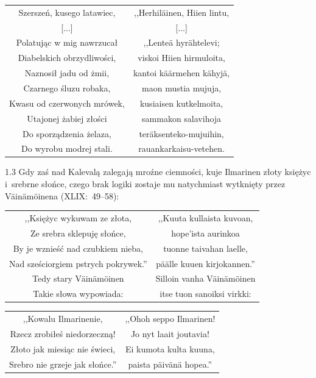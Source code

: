 \documentclass[11pt,a4paper,twoside]{report}
\begin{document}
{\centering
\small
\begin{longtable}{c c}
Szerszeń, kusego latawiec, & ,,Herhiläinen, Hiien lintu, \\
{[...]} & {[...]}\\
Polatując w mig nawrzucał & ,,Lenteä hyrähtelevi; \\
Diabelskich obrzydliwości, & viskoi Hiien hirmuloita, \\
Naznosił jadu od żmii, & kantoi käärmehen kähyjä, \\
Czarnego śluzu robaka, & maon mustia mujuja, \\
Kwasu od czerwonych mrówek, & kusiaisen kutkelmoita, \\
Utajonej żabiej złości & sammakon salavihoja \\
Do sporządzenia żelaza, & teräksenteko-mujuihin, \\
Do wyrobu modrej stali. & rauankarkaisu-vetehen. \\
\end{longtable}
}
\begin{spacing}{1.3}
Gdy zaś nad Kalevalą zalegają mroźne ciemności, kuje Ilmarinen złoty księżyc i~srebrne słońce, czego brak logiki zostaje mu natychmiast wytknięty przez Väinämöinena (XLIX:~49--58):
\end{spacing}
{\centering
\small
\begin{longtable}{c c}
,,Księżyc wykuwam ze złota, & ,,Kuuta kullaista kuvoan, \\
Ze srebra sklepuję słońce, & hope'ista aurinkoa \\
By je wznieść nad czubkiem nieba, & tuonne taivahan laelle, \\
Nad sześciorgiem pstrych pokrywek.'' & päälle kuuen kirjokannen.'' \\
Tedy stary Väinämöinen & Silloin vanha Väinämöinen \\
Takie słowa wypowiada: & itse tuon sanoiksi virkki: \\ %
\end{longtable}
}
{\centering
\small
\begin{longtable}{c c}
,,Kowalu Ilmarinenie, & ,,Ohoh seppo Ilmarinen! \\
Rzecz zrobiłeś niedorzeczną! & Jo nyt laait joutavia! \\
Złoto jak miesiąc nie świeci, & Ei kumota kulta kuuna, \\
Srebro nie grzeje jak słońce.'' & paista päivänä hopea.'' \\
\end{longtable}
}
\end{document}
